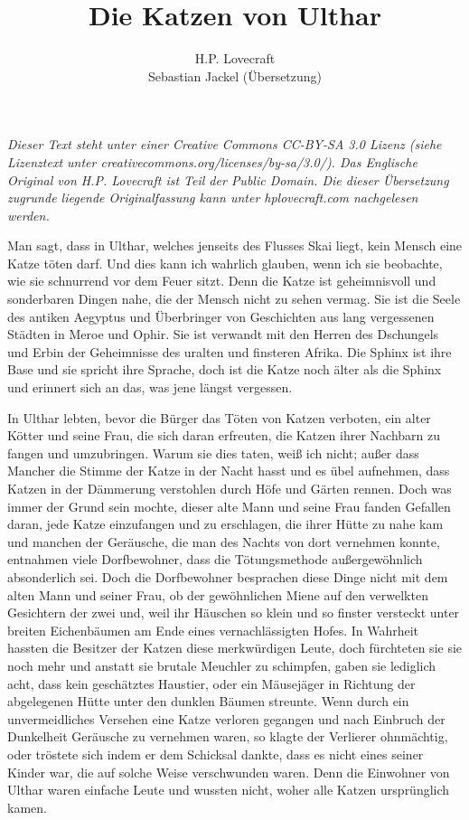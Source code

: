 \documentclass[a4paper]{memoir}
\begin{document}
\title{Die Katzen von Ulthar}
\author{H.P. Lovecraft\\
		Sebastian Jackel (Übersetzung)}
\date{}
\maketitle

\textit{Dieser Text steht unter einer Creative Commons CC-BY-SA 3.0 Lizenz
(siehe Lizenztext unter creativecommons.org/licenses/by-sa/3.0/). Das Englische Original von H.P. Lovecraft ist Teil der Public Domain. Die dieser Übersetzung zugrunde liegende Originalfassung kann unter hplovecraft.com nachgelesen werden.}

\vspace{12pt}

Man sagt, dass in Ulthar, welches jenseits des Flusses Skai liegt, kein Mensch eine Katze töten darf. Und dies kann ich wahrlich glauben, wenn ich sie beobachte, wie sie schnurrend vor dem Feuer sitzt. Denn die Katze ist geheimnisvoll und sonderbaren Dingen nahe, die der Mensch nicht zu sehen vermag. Sie ist die Seele des antiken Aegyptus und Überbringer von Geschichten aus lang vergessenen Städten in Meroe und Ophir. Sie ist verwandt mit den Herren des Dschungels und Erbin der  Geheimnisse des uralten und finsteren Afrika. Die Sphinx ist ihre Base und sie spricht ihre Sprache, doch ist die Katze noch älter als die Sphinx und erinnert sich an das, was jene längst vergessen.

In Ulthar lebten, bevor die Bürger das Töten von Katzen verboten, ein alter Kötter und seine Frau, die sich daran erfreuten, die Katzen ihrer Nachbarn zu fangen und umzubringen. Warum sie dies taten, weiß ich nicht; außer dass Mancher die Stimme der Katze in der Nacht hasst und es übel aufnehmen, dass Katzen in der Dämmerung verstohlen durch Höfe und Gärten rennen. Doch was immer der Grund sein mochte, dieser alte Mann und seine Frau fanden Gefallen daran, jede Katze einzufangen und zu erschlagen, die ihrer Hütte zu nahe kam und manchen der Geräusche, die man des Nachts von dort vernehmen konnte, entnahmen viele Dorfbewohner, dass die Tötungsmethode außergewöhnlich absonderlich sei. Doch die Dorfbewohner besprachen diese Dinge nicht  mit dem alten Mann und seiner Frau, ob der gewöhnlichen Miene auf den verwelkten Gesichtern der zwei und, weil ihr Häuschen so klein und so finster versteckt unter breiten Eichenbäumen am Ende eines vernachlässigten Hofes. In Wahrheit hassten die Besitzer der Katzen diese merkwürdigen Leute, doch fürchteten sie sie noch mehr und anstatt sie brutale Meuchler zu schimpfen, gaben sie lediglich acht, dass kein geschätztes Haustier, oder ein Mäusejäger in Richtung der abgelegenen Hütte unter den dunklen Bäumen streunte. Wenn durch ein unvermeidliches Versehen eine Katze verloren gegangen und nach Einbruch der Dunkelheit Geräusche zu vernehmen waren, so klagte der Verlierer ohnmächtig, oder tröstete sich indem er dem Schicksal dankte, dass es nicht eines seiner Kinder war, die auf solche Weise verschwunden waren. Denn die Einwohner von Ulthar waren einfache Leute und wussten nicht, woher alle Katzen ursprünglich kamen.
\end{document}
